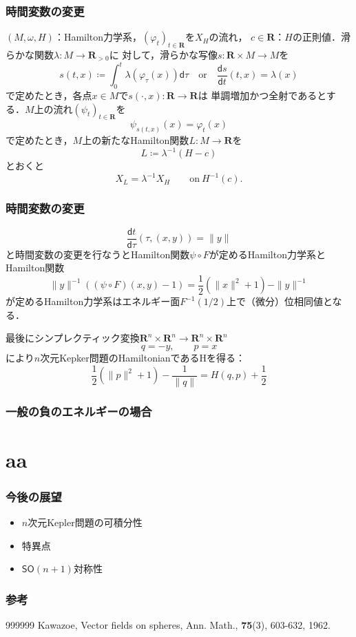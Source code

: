 \documentclass[11pt,%
dvipdfmx,cjk]{beamer}
\newcommand{\rr}{\mathbf{R}}
\begin{document}
\begin{frame}
\frametitle{時間変数の変更}
	\((M, \omega, H)\)：Hamilton力学系，\((\varphi_{t})_{t \in \rr}\)を\(X_{H}\)の流れ，
	\(c \in \rr\)：\(H\)の正則値．滑らかな関数\(\lambda\colon M \to \rr_{>0}\)に
	対して，滑らかな写像\(s\colon \rr \times M \to M\)を
	\[
		s(t,x) \coloneqq \int_{0}^{t} \lambda(\varphi_{\tau}(x)) \mathsf{d}\tau \quad
		\text{or} \quad
 		\dfrac{\mathsf{d}s}{\mathsf{d}t}(t, x) = \lambda(x)
	\]
	で定めたとき，各点\(x \in M\)で\(s(\cdot, x)\colon \rr \to \rr\)は
	単調増加かつ全射であるとする．\(M\)上の流れ\((\psi_{t})_{t \in \rr}\)を
	\[
		\psi_{s(t,x)}(x) = \varphi_{t}(x)
	\]
	で定めたとき，\(M\)上の新たなHamilton関数\(L\colon M \to \rr\)を
	\[
		L \coloneqq \lambda^{-1}(H - c)
	\]
	とおくと	
	\[
		X_{L} = \lambda^{-1}X_{H}\qquad \text{on}\ H^{-1}(c).
	\]
\end{frame}

\begin{frame}
\frametitle{時間変数の変更}
\[
	\frac{\mathsf{d}t}{\mathsf{d}\tau}(\tau,(x,y)) = \|y\|
\]
と時間変数の変更を行なうとHamilton関数\(\psi \circ F\)が定めるHamilton力学系と
Hamilton関数
\[
	\|y\|^{-1}((\psi \circ F)(x,y) -1) = \frac{1}{2}(\|x\|^{2} + 1) - \|y\|^{-1}
\]
が定めるHamilton力学系はエネルギー面\(F^{-1}(1/2)\)上で（微分）位相同値となる． 
\end{frame}

\begin{frame}
最後にシンプレクティック変換\(\rr^{n} \times \rr^{n} \to \rr^{n} \times \rr^{n}\)
\[
	q = -y, \qquad p = x
\]
により\(n\)次元Kepker問題のHamiltonianであるHを得る：
\[
	\dfrac{1}{2}(\|p\|^{2} + 1) - \frac{1}{\|q\|} = H(q,p) + \dfrac{1}{2}
\]
\end{frame}

\begin{frame}
\frametitle{一般の負のエネルギーの場合}

\end{frame}


\appendix
\section*{aa}
\begin{frame}
	\frametitle{今後の展望}
	\begin{itemize}
		\item 
		\(n\)次元Kepler問題の可積分性
	
		\item
		特異点
	
		\item
		\(\mathsf{SO}(n+1)\)対称性
	\end{itemize}
	\end{frame}
	
	\begin{frame}
	\frametitle{参考}
	{\footnotesize
	\begin{thebibliography}{999999}
	\beamertemplatetextbibitems
		 Kawazoe, 
		 Vector fields on spheres, 
		 Ann. Math., \textbf{75}(3), 603-632, 1962. 
	\end{thebibliography}
	}
	\end{frame}
\end{document}
